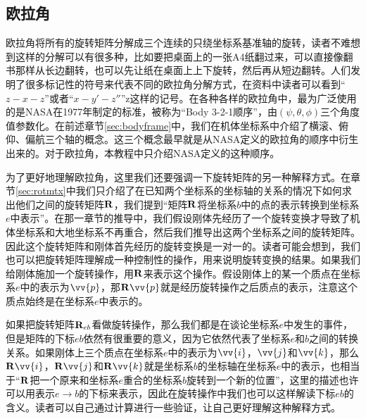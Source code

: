 \documentclass[11pt]{article}
\begin{document}
\subsection{欧拉角}
欧拉角将所有的旋转矩阵分解成三个连续的只绕坐标系基准轴的旋转，读者不难想到这样的分解可以有很多种，比如要把桌面上的一张A4纸翻过来，可以直接像翻书那样从长边翻转，也可以先让纸在桌面上上下旋转，然后再从短边翻转。人们发明了很多标记性的符号来代表不同的欧拉角分解方式，在资料中读者可以看到“$z-x-z$”或者“$x-y'-z''$”z这样的记号。在各种各样的欧拉角中，最为广泛使用的是NASA在1977年制定的标准，被称为“Body 3-2-1顺序”，由$(\psi, \theta, \phi)$三个角度值参数化\cite{nasa}。在前述章节\ref{sec:bodyframe}中，我们在机体坐标系中介绍了横滚、俯仰、偏航三个轴的概念。这三个概念最早就是从NASA定义的欧拉角的顺序中衍生出来的。对于欧拉角，本教程中只介绍NASA定义的这种顺序。

为了更好地理解欧拉角，这里我们还要强调一下旋转矩阵的另一种解释方式。在章节\ref{sec:rotmtx}中我们只介绍了在已知两个坐标系的坐标轴的关系的情况下如何求出他们之间的旋转矩阵${\bf R}$，我们提到“矩阵${\bf R}$将坐标系$b$中的点的表示转换到坐标系$e$中表示”。在那一章节的推导中，我们假设刚体先经历了一个旋转变换才导致了机体坐标系和大地坐标系不再重合，然后我们推导出这两个坐标系之间的旋转矩阵。因此这个旋转矩阵和刚体首先经历的旋转变换是一对一的。读者可能会想到，我们也可以把旋转矩阵理解成一种控制性的操作，用来说明旋转变换的结果。如果我们给刚体施加一个旋转操作，用${\bf R}$来表示这个操作。假设刚体上的某一个质点在坐标系$e$中的表示为$\vv{p}$，那${\bf R}\vv{p}$就是经历旋转操作之后质点的表示，注意这个质点始终是在坐标系$e$中表示的。

如果把旋转矩阵${\bf R}_{eb}$看做旋转操作，那么我们都是在谈论坐标系$e$中发生的事件，但是矩阵的下标$eb$依然有很重要的意义，因为它依然代表了坐标系$e$和$b$之间的转换关系。如果刚体上三个质点在坐标系$e$中的表示为$\vv{i}$，$\vv{j}$和$\vv{k}$，那么${\bf R}\vv{i}$，${\bf R}\vv{j}$和${\bf R}\vv{k}$就是坐标系$b$的坐标轴在坐标系$e$中的表示，也相当于“${\bf R}$把一个原来和坐标系$e$重合的坐标系$b$旋转到一个新的位置”，这里的描述也许可以用表示$e\rightarrow b$的下标来表示，因此在旋转操作中我们也可以这样解读下标$eb$的含义。读者可以自己通过计算进行一些验证，让自己更好理解这种解释方式。
\end{document}
